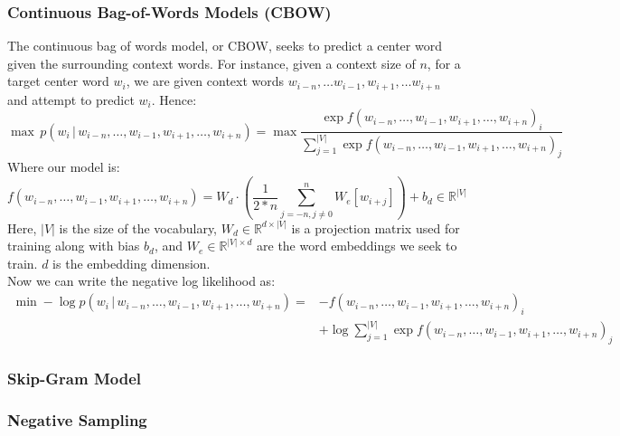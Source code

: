 \subsubsection{Continuous Bag-of-Words Models (CBOW)}
The continuous bag of words model, or CBOW, seeks to predict a center word
given the surrounding context words. For instance, given a context size of $n$,
for a target center word $w_i$, we are given context words
$w_{i-n}, \dots w_{i-1}, w_{i+1}, \dots w_{i+n}$ and attempt to predict $w_i$.
Hence:
\begin{equation}
  \max \, p(w_{i} \,|\, w_{i-n}, \dots, w_{i-1}, w_{i+1}, \dots, w_{i+n}) = \max \frac{\exp f(w_{i-n}, \dots, w_{i-1}, w_{i+1}, \dots, w_{i+n})_i}{\sum_{j=1}^{|V|}\exp f(w_{i-n}, \dots, w_{i-1}, w_{i+1}, \dots, w_{i+n})_j }
\end{equation}
Where our model is:
\begin{equation}
  f(w_{i-n}, \dots, w_{i-1}, w_{i+1}, \dots, w_{i+n}) = W_d \cdot \left( \frac{1}{2*n}\sum_{j=-n,j\not=0}^n W_e[w_{i+j}] \right) + b_d \in \mathbb{R}^{|V|}
\end{equation}
Here, $|V|$ is the size of the vocabulary, $W_d\in\mathbb{R}^{d\times|V|}$ is
a projection matrix used for training along with bias $b_d$,
and $W_e\in\mathbb{R}^{|V|\times d}$ are the word embeddings we seek to train.
$d$ is the embedding dimension. \\
Now we can write the negative log likelihood as:
\begin{equation}
  \begin{split}
    \min -\log p(w_{i} \,|\, w_{i-n}, \dots, w_{i-1}, w_{i+1}, \dots, w_{i+n}) =& - f(w_{i-n}, \dots, w_{i-1}, w_{i+1}, \dots, w_{i+n})_i \\
    &+ \log \sum_{j=1}^{|V|} \exp f(w_{i-n}, \dots, w_{i-1}, w_{i+1}, \dots, w_{i+n})_j
  \end{split}
\end{equation}
\subsubsection{Skip-Gram Model}
\subsubsection{Negative Sampling}
